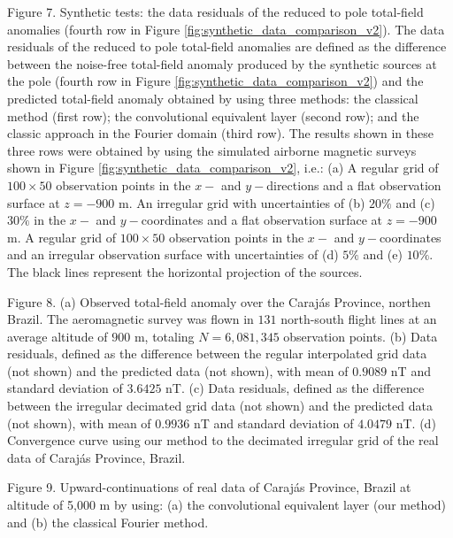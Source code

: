 \documentclass[manuscript,noblind]{geophysics}
\begin{document}
{
	{Figure 7. Synthetic tests: the data residuals of the reduced to pole total-field anomalies (fourth row in Figure \ref{fig:synthetic_data_comparison_v2}). The data residuals of the reduced to pole total-field anomalies are defined as the difference between the noise-free total-field anomaly produced by the synthetic sources at the pole (fourth  row in Figure \ref{fig:synthetic_data_comparison_v2}) and the predicted total-field anomaly obtained by using three methods: the classical method (first row); the convolutional equivalent layer (second row); and the classic approach in the Fourier domain (third row). The results shown in these three rows were obtained by using the simulated airborne magnetic surveys shown in Figure \ref{fig:synthetic_data_comparison_v2}, i.e.: (a) A regular grid of $100 \times 50$ observation points in the $x-$ and $y-$directions and a flat observation surface at $z= -900$ m. An irregular grid with uncertainties of (b) $20\%$ and (c) $30\%$ in the $x-$ and $y-$coordinates and a flat observation surface at $z= - 900$ m.	A regular grid  of $100 \times 50$ observation points in the $x-$ and $y-$coordinates and an irregular observation surface with uncertainties of (d) $5\%$ and  (e) $10\%$. The black lines represent the horizontal projection of the sources.}
	\label{fig:synthetic_zrtp_residuals_comparison_v2}
}


{
	{Figure 8. (a) Observed total-field anomaly over the Carajás Province, northen Brazil. The aeromagnetic survey was flown in $131$ north-south flight lines at an average altitude of $900$ m, totaling $N = 6,081,345$ observation points. (b) Data residuals, defined as the difference between the regular interpolated grid data (not shown) and the predicted data (not shown), with mean of $0.9089$ nT and standard deviation of $3.6425$ nT. (c) Data residuals, defined as the difference between the irregular decimated grid data (not shown) and the predicted data (not shown), with mean of $0.9936$ nT and standard deviation of $4.0479$ nT. (d) Convergence curve using our method to the decimated irregular grid of the real data of Carajás Province, Brazil.}
	\label{fig:carajas_residuals_comparison}
}

{
	{Figure 9. Upward-continuations of real data of Carajás Province, Brazil at altitude of 5,000 m by using: (a) the convolutional equivalent layer (our method) and (b) the classical Fourier method.}
	\label{fig:carajas_upward_comparison}
}
\end{document}
